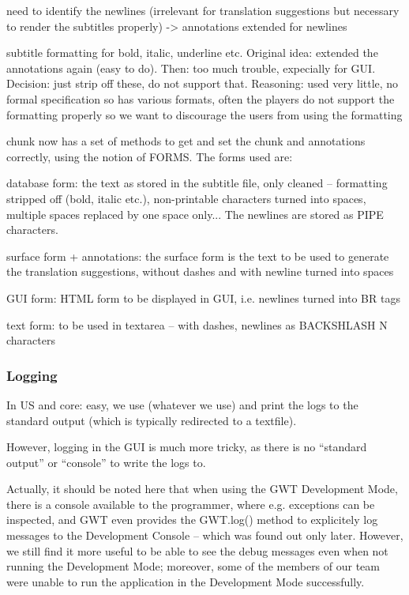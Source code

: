need to identify the newlines (irrelevant for translation suggestions but necessary to render the subtitles properly) -> annotations extended for newlines

subtitle formatting for bold, italic, underline etc. Original idea: extended the annotations again (easy to do). Then: too much trouble, expecially for GUI. Decision: just strip off these, do not support that. Reasoning: used very little, no formal specification so has various formats, often the players do not support the formatting properly so we want to discourage the users from using the formatting

chunk now has a set of methods to get and set the chunk and annotations correctly, using the notion of FORMS. The forms used are:

database form: the text as stored in the subtitle file, only cleaned -- formatting stripped off (bold, italic etc.), non-printable characters turned into spaces, multiple spaces replaced by one space only... The newlines are stored as PIPE characters.

surface form + annotations: the surface form is the text to be used to generate the translation suggestions, without dashes and with newline turned into spaces

GUI form: HTML form to be displayed in GUI, i.e. newlines turned into BR tags

text form: to be used in textarea -- with dashes, newlines as BACKSHLASH N characters

\subsubsection{Logging}

In US and core: easy, we use (whatever we use) 
and print the logs to the standard output (which is typically redirected to a textfile).

However, logging in the GUI is much more tricky, as there is no ``standard output'' or ``console'' to write the logs to.

Actually, it should be noted here that when using the GWT Development Mode, there is a console available to the programmer, where e.g. exceptions can be inspected, and GWT even provides the GWT.log() method to explicitely log messages to the Development Console -- which was found out only later. However, we still find it more useful to be able to see the debug messages even when not running the Development Mode; moreover, some of the members of our team were unable to run the application in the Development Mode successfully.


